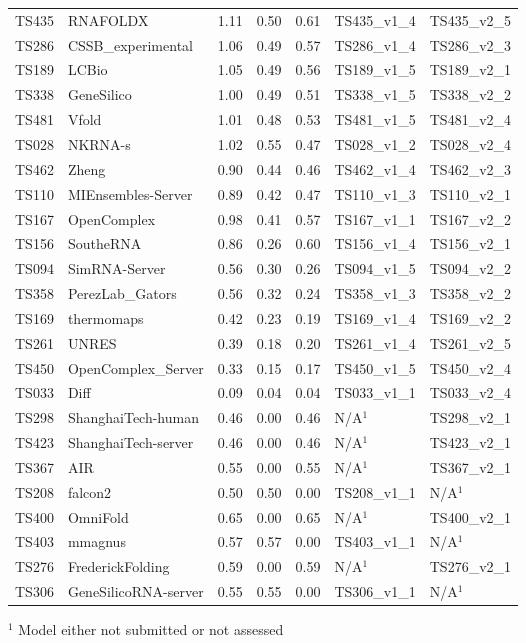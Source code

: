 \begin{table}[ht]
{\begin{tabular}{llrrrll}
TS435 & RNAFOLDX & 1.11 & 0.50 & 0.61 & TS435\_v1\_4 & TS435\_v2\_5 \\ 
TS286 & CSSB\_experimental & 1.06 & 0.49 & 0.57 & TS286\_v1\_4 & TS286\_v2\_3 \\ 
TS189 & LCBio & 1.05 & 0.49 & 0.56 & TS189\_v1\_5 & TS189\_v2\_1 \\ 
TS338 & GeneSilico & 1.00 & 0.49 & 0.51 & TS338\_v1\_5 & TS338\_v2\_2 \\ 
TS481 & Vfold & 1.01 & 0.48 & 0.53 & TS481\_v1\_5 & TS481\_v2\_4 \\ 
TS028 & NKRNA-s & 1.02 & 0.55 & 0.47 & TS028\_v1\_2 & TS028\_v2\_4 \\ 
TS462 & Zheng & 0.90 & 0.44 & 0.46 & TS462\_v1\_4 & TS462\_v2\_3 \\ 
TS110 & MIEnsembles-Server & 0.89 & 0.42 & 0.47 & TS110\_v1\_3 & TS110\_v2\_1 \\ 
TS167 & OpenComplex & 0.98 & 0.41 & 0.57 & TS167\_v1\_1 & TS167\_v2\_2 \\ 
TS156 & SoutheRNA & 0.86 & 0.26 & 0.60 & TS156\_v1\_4 & TS156\_v2\_1 \\ 
TS094 & SimRNA-Server & 0.56 & 0.30 & 0.26 & TS094\_v1\_5 & TS094\_v2\_2 \\ 
TS358 & PerezLab\_Gators & 0.56 & 0.32 & 0.24 & TS358\_v1\_3 & TS358\_v2\_2 \\ 
TS169 & thermomaps & 0.42 & 0.23 & 0.19 & TS169\_v1\_4 & TS169\_v2\_2 \\ 
TS261 & UNRES & 0.39 & 0.18 & 0.20 & TS261\_v1\_4 & TS261\_v2\_5 \\ 
TS450 & OpenComplex\_Server & 0.33 & 0.15 & 0.17 & TS450\_v1\_5 & TS450\_v2\_4 \\ 
TS033 & Diff & 0.09 & 0.04 & 0.04 & TS033\_v1\_1 & TS033\_v2\_4 \\ 
TS298 & ShanghaiTech-human & 0.46 & 0.00 & 0.46 & N/A$^{1}$ & TS298\_v2\_1 \\ 
TS423 & ShanghaiTech-server & 0.46 & 0.00 & 0.46 & N/A$^{1}$ & TS423\_v2\_1 \\ 
TS367 & AIR & 0.55 & 0.00 & 0.55 & N/A$^{1}$ & TS367\_v2\_1 \\ 
TS208 & falcon2 & 0.50 & 0.50 & 0.00 & TS208\_v1\_1 & N/A$^{1}$ \\ 
TS400 & OmniFold & 0.65 & 0.00 & 0.65 & N/A$^{1}$ & TS400\_v2\_1 \\ 
TS403 & mmagnus & 0.57 & 0.57 & 0.00 & TS403\_v1\_1 & N/A$^{1}$ \\ 
TS276 & FrederickFolding & 0.59 & 0.00 & 0.59 & N/A$^{1}$ & TS276\_v2\_1 \\ 
TS306 & GeneSilicoRNA-server & 0.55 & 0.55 & 0.00 & TS306\_v1\_1 & N/A$^{1}$ \\ 
\bottomrule
\end{tabular}%
}
\begin{flushleft}\footnotesize $^{1}$ Model either not submitted or not assessed\end{flushleft}
\end{table}
